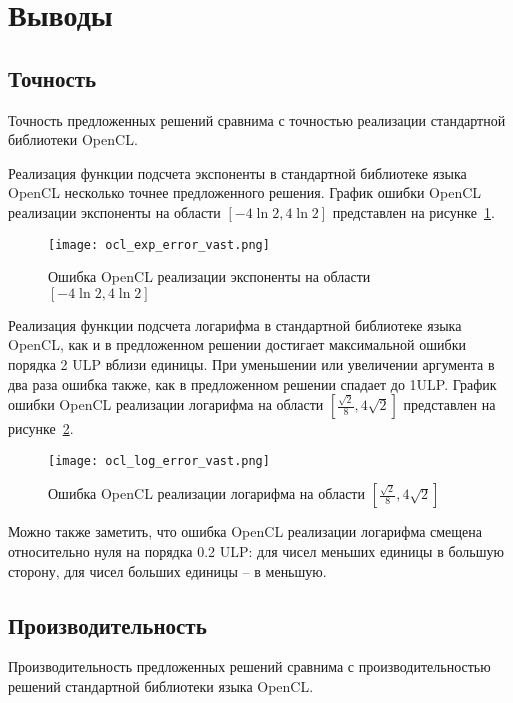 \section{Выводы}

\subsection{Точность}

Точность предложенных решений сравнима с точностью реализации стандартной библиотеки OpenCL.

Реализация функции подсчета экспоненты в стандартной библиотеке языка OpenCL несколько точнее предложенного решения.
График ошибки OpenCL реализации экспоненты на области $[-4\ln{2}, 4\ln{2}]$ представлен на рисунке~\ref{plot:ocl_exp:small}.


\begin{figure}[hbt]
    \centering
    \texttt{[image: ocl\_exp\_error\_vast.png]}
    \caption{Ошибка OpenCL реализации экспоненты на области $[-4\ln{2}, 4\ln{2}]$}
    \label{plot:ocl_exp:small}
\end{figure}

Реализация функции подсчета логарифма в стандартной библиотеке языка OpenCL, как и в предложенном решении достигает максимальной ошибки порядка 2 ULP вблизи единицы.
При уменьшении или увеличении аргумента в два раза ошибка также, как в предложенном решении спадает до 1ULP.
График ошибки OpenCL реализации логарифма на области $[\frac{\sqrt{2}}{8}, 4\sqrt{2}]$ представлен на рисунке~\ref{plot:ocl_log:small}.


\begin{figure}[hbt]
    \centering
    \texttt{[image: ocl\_log\_error\_vast.png]}
    \caption{Ошибка OpenCL реализации логарифма на области $[\frac{\sqrt{2}}{8}, 4\sqrt{2}]$}
    \label{plot:ocl_log:small}
\end{figure}

Можно также заметить, что ошибка OpenCL реализации логарифма смещена относительно нуля на порядка 0.2 ULP: для чисел меньших единицы в большую сторону, для чисел больших единицы -- в меньшую.

\subsection{Производительность}

Производительность предложенных решений сравнима с производительностью решений стандартной библиотеки языка OpenCL.

